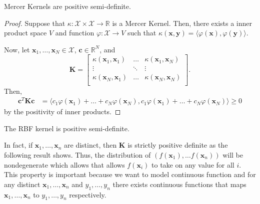 \begin{lemma}
    Mercer Kernels are positive semi-definite.
\end{lemma}
\begin{proof}
    Suppose that $\kappa: \mathcal{X} \times \mathcal{X} \to \mathbb{R}$ is a Mercer Kernel.
    Then, there exists a inner product space $V$ and function $\varphi: \mathcal{X} \to V$ such that $\kappa(\mathbf{x}, \mathbf{y}) = \langle\varphi(\mathbf{x}), \varphi(\mathbf{y})\rangle$.

    Now, let $\mathbf{x}_1, \ldots, \mathbf{x}_N \in \mathcal{X}$, $\mathbf{c} \in \mathbb{R}^{N}$, and
    \begin{equation*}
        \mathbf{K} =
        \begin{bmatrix}
            \kappa(\mathbf{x}_1, \mathbf{x}_1) & \ldots & \kappa(\mathbf{x}_1, \mathbf{x}_N) \\
            \vdots & \ddots & \vdots \\
            \kappa(\mathbf{x}_N, \mathbf{x}_1) & \ldots & \kappa(\mathbf{x}_N, \mathbf{x}_N) \\
        \end{bmatrix}
        .
    \end{equation*}
    Then,
    \begin{align*}
        \mathbf{c}^{T} \mathbf{K} \mathbf{c}
        & = \langle c_1 \varphi(\mathbf{x}_1) + \ldots + c_N \varphi(\mathbf{x}_N), c_1 \varphi(\mathbf{x}_1) + \ldots + c_N \varphi(\mathbf{x}_N) \rangle
        \geq 0
    \end{align*}
    by the positivity of inner products.
\end{proof}

\begin{corollary}
    \label{corr:rbf-psd}
    The RBF kernel is positive semi-definite.
\end{corollary}

In fact, if $\mathbf{x}_1, \ldots, \mathbf{x}_n$ are distinct, then $\mathbf{K}$ is strictly positive definite as the following result shows.
Thus, the distribution of $(f(\mathbf{x}_1), \ldots f(\mathbf{x}_n))$ will be nondegenerate which allows that allows $f(\mathbf{x}_i)$ to take on any value for all $i$.
This property is important because we want to model continuous function and for any distinct $\mathbf{x}_1, \ldots, \mathbf{x}_n$ and $y_1, \ldots, y_n$ there exists continuous functions that maps $\mathbf{x}_1, \ldots, \mathbf{x}_n$ to $y_1, \ldots, y_n$ respectively.


